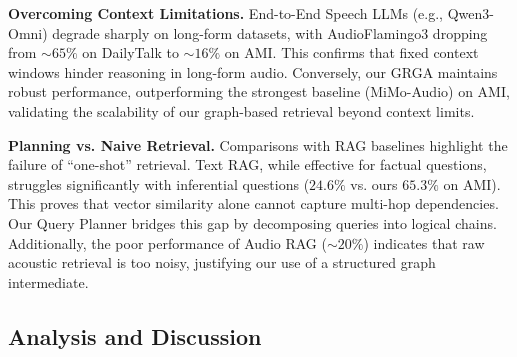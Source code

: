 \documentclass[11pt]{article}
\begin{document}
\textbf{Overcoming Context Limitations.}
 End-to-End Speech LLMs (e.g., Qwen3-Omni) degrade sharply on long-form datasets, with AudioFlamingo3 dropping from $ \sim 65\% $ on DailyTalk to $ \sim 16\% $ on AMI. This confirms that fixed context windows hinder reasoning in long-form audio. Conversely, our GRGA maintains robust performance, outperforming the strongest baseline (MiMo-Audio) on AMI, validating the scalability of our graph-based retrieval beyond context limits.

\textbf{Planning vs. Naive Retrieval.}
Comparisons with RAG baselines highlight the failure of ``one-shot'' retrieval. Text RAG, while effective for factual questions, struggles significantly with inferential questions ($ 24.6\% $ vs. ours $ 65.3\% $ on AMI). This proves that vector similarity alone cannot capture multi-hop dependencies. Our Query Planner bridges this gap by decomposing queries into logical chains. Additionally, the poor performance of Audio RAG ($ \sim20\% $) indicates that raw acoustic retrieval is too noisy, justifying our use of a structured graph intermediate.

\begin{table}[t]
    \centering
    \renewcommand{\arraystretch}{1.15}
    \caption{\textbf{Error analysis on benchmark datasets.} We report Word Error Rate (WER) and Diarization Error Rate (DER) under strict ($ 0\,\text{s} $) and standard ($ 0.25\,\text{s} $) collar (tolerance
) settings. All metrics are reported in percentage (\%), and $\downarrow$ denotes that lower values are better.}
    \label{tab:upstream_errors}
\end{table}

\subsection{Analysis and Discussion}
\end{document}
